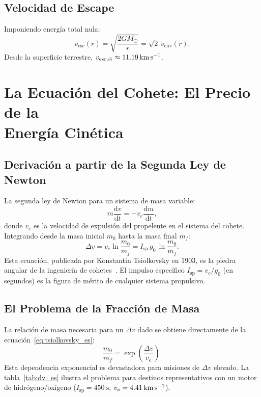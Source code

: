 \documentclass[12pt,a4paper]{article}
\newcommand{\dd}{\mathrm{d}}
\begin{document}
\subsection{Velocidad de Escape}

Imponiendo energía total nula:
\begin{equation}
  v_{\mathrm{esc}}(r) = \sqrt{\frac{2GM_\odot}{r}} = \sqrt{2}\,v_{\mathrm{circ}}(r).
\end{equation}
Desde la superficie terrestre, $v_{\mathrm{esc},\oplus} \approx \SI{11{,}19}{\kilo\meter\per\second}$.

\section[La Ecuación del Cohete: El Precio de la Energía Cinética]{La Ecuación del Cohete: El Precio de la\\Energía Cinética}

\subsection{Derivación a partir de la Segunda Ley de Newton}

La segunda ley de Newton para un sistema de masa variable:
\begin{equation}
  m\frac{\dd v}{\dd t} = -v_e\frac{\dd m}{\dd t},
\end{equation}
donde $v_e$ es la velocidad de expulsión del propelente en el sistema del
cohete. Integrando desde la masa inicial $m_0$ hasta la masa final $m_f$:
\begin{equation}
  \boxed{\Delta v = v_e \ln\!\frac{m_0}{m_f} = I_{\mathrm{sp}}\,g_0\,\ln\!\frac{m_0}{m_f}.}
  \label{eq:tsiolkovsky_es}
\end{equation}
Esta ecuación, publicada por Konstantin Tsiolkovsky en 1903, es la piedra
angular de la ingeniería de cohetes~\citep{Tsiolkovsky1903}. El impulso específico $I_{\mathrm{sp}} = v_e/g_0$
(en segundos) es la figura de mérito de cualquier sistema propulsivo.

\subsection{El Problema de la Fracción de Masa}

La relación de masa necesaria para un $\Delta v$ dado se obtiene directamente
de la ecuación~\eqref{eq:tsiolkovsky_es}:
\begin{equation}
  \frac{m_0}{m_f} = \exp\!\left(\frac{\Delta v}{v_e}\right).
\end{equation}
Esta dependencia exponencial es devastadora para misiones de $\Delta v$
elevado. La tabla~\ref{tab:dv_es} ilustra el problema para destinos
representativos con un motor de hidrógeno/oxígeno
($I_{\mathrm{sp}} = \SI{450}{\second}$,
$v_e = \SI{4{,}41}{\kilo\meter\per\second}$).
\end{document}
